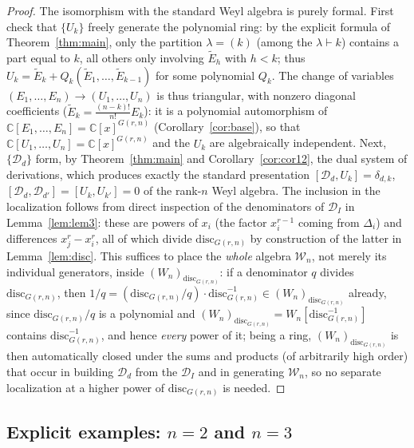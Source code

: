 \documentclass[11pt]{article}
\theoremstyle{remark}
\newcommand{\CC}{\mathbb{C}}
\begin{document}
\begin{proof}
The isomorphism with the standard Weyl algebra is purely formal. First check that $\{U_k\}$ freely generate the polynomial ring: by the explicit formula of Theorem~\ref{thm:main}, only the partition $\lambda=(k)$ (among the $\lambda\vdash k$) contains a part equal to $k$, all others only involving $\widetilde E_h$ with $h<k$; thus $U_k=\widetilde E_k+Q_k(\widetilde E_1,\dots,\widetilde E_{k-1})$ for some polynomial $Q_k$. The change of variables $(E_1,\dots,E_n)\to(U_1,\dots,U_n)$ is thus triangular, with nonzero diagonal coefficients ($\widetilde E_k=\frac{(n-k)!}{n!}E_k$): it is a polynomial automorphism of $\CC[E_1,\dots,E_n]=\CC[x]^{G(r,n)}$ (Corollary~\ref{cor:base}), so that $\CC[U_1,\dots,U_n]=\CC[x]^{G(r,n)}$ and the $U_k$ are algebraically independent. Next, $\{\mathcal D_d\}$ form, by Theorem~\ref{thm:main} and Corollary~\ref{cor:cor12}, the dual system of derivations, which produces exactly the standard presentation $[\mathcal D_d,U_k]=\delta_{d,k}$, $[\mathcal D_d,\mathcal D_{d'}]=[U_k,U_{k'}]=0$ of the rank-$n$ Weyl algebra. The inclusion in the localization follows from direct inspection of the denominators of $\mathcal D_I$ in Lemma~\ref{lem:lem3}: these are powers of $x_i$ (the factor $x_i^{r-1}$ coming from $\Delta_i$) and differences $x_j^r-x_i^r$, all of which divide $\mathrm{disc}_{G(r,n)}$ by construction of the latter in Lemma~\ref{lem:disc}. This suffices to place the \emph{whole} algebra $\mathcal W_n$, not merely its individual generators, inside $(W_n)_{\mathrm{disc}_{G(r,n)}}$: if a denominator $q$ divides $\mathrm{disc}_{G(r,n)}$, then $1/q=(\mathrm{disc}_{G(r,n)}/q)\cdot\mathrm{disc}_{G(r,n)}^{-1}\in(W_n)_{\mathrm{disc}_{G(r,n)}}$ already, since $\mathrm{disc}_{G(r,n)}/q$ is a polynomial and $(W_n)_{\mathrm{disc}_{G(r,n)}}=W_n[\mathrm{disc}_{G(r,n)}^{-1}]$ contains $\mathrm{disc}_{G(r,n)}^{-1}$, and hence \emph{every} power of it; being a ring, $(W_n)_{\mathrm{disc}_{G(r,n)}}$ is then automatically closed under the sums and products (of arbitrarily high order) that occur in building $\mathcal D_d$ from the $\mathcal D_I$ and in generating $\mathcal W_n$, so no separate localization at a higher power of $\mathrm{disc}_{G(r,n)}$ is needed.
\end{proof}

\subsection{Explicit examples: \texorpdfstring{$n=2$ and $n=3$}{n=2 and n=3}}
\end{document}

